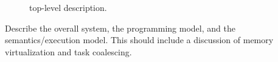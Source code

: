\begin{figure}
	\centering
	\caption{\sys top-level description.}
	\label{fig:}
\end{figure}

Describe the overall system, the programming model, and the semantics/execution model. This should include a discussion of memory virtualization and task coalescing.